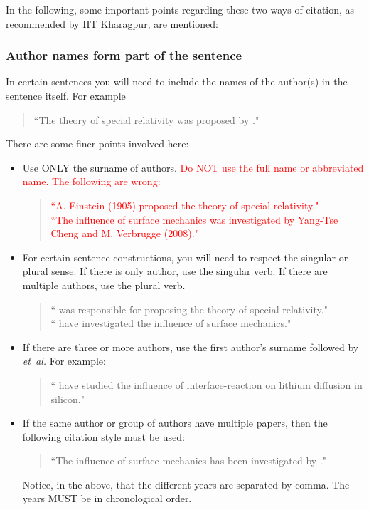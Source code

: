 In the following, some important points regarding these two ways of citation, as recommended by IIT Kharagpur, are mentioned:

\subsubsection{Author names form part of the sentence}

In certain sentences you will need to include the names of the author(s) in the sentence itself. For example
\begin{quote} 
``The theory of special relativity was proposed by \citet{Einstein3}." 
\end{quote}


There are some finer points involved here:

\begin{itemize}
\item Use ONLY the surname of authors. \textcolor{red}{Do NOT use the full name or abbreviated name. The following are wrong:}
\begin{quote}
\textcolor{red}{``A. Einstein (1905) proposed the theory of special relativity."}\\
\textcolor{red}{``The influence of surface mechanics was investigated by Yang-Tse Cheng and M. Verbrugge (2008)."}
\end{quote} 

\item For certain sentence constructions, you will need to respect the singular or plural sense. If there is only author, use the singular verb. If there are multiple authors, use the plural verb. 
\begin{quote}
``\citet{Einstein3} was responsible for proposing the theory of special relativity." \\
``\citet{2008ChengVerbrugge} have investigated the influence of surface mechanics."
\end{quote}


\item If there are three or more authors, use the first author's surname followed by {\em et~al.} For example:
\begin{quote}
``\citet{2013JMPSCui} have studied the influence of interface-reaction on lithium diffusion in silicon." 
\end{quote}

\item If the same author or group of authors have multiple papers, then the following citation style must be used:
\begin{quote}
``The influence of surface mechanics has been investigated by \citet{2008ChengVerbrugge, 2009ChengVerbrugge}."
\end{quote}
Notice, in the above, that the different years are separated by comma. The years MUST be in chronological order.


\end{itemize}
